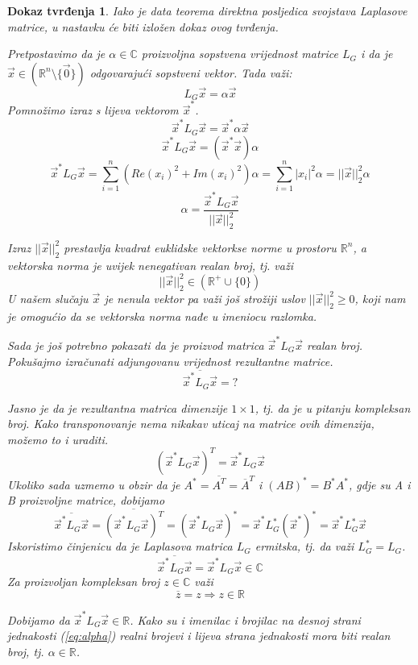 \documentclass[11pt]{article}
\newtheorem*{custom_proof}{Dokaz tvrđenja}
\begin{document}
	\begin{custom_proof}
	Iako je data teorema direktna posljedica svojstava Laplasove matrice, u nastavku će biti izložen dokaz ovog tvrđenja.
	
	Pretpostavimo da je $\alpha \in \mathbb{C}$ proizvoljna sopstvena vrijednost matrice $L_G$ i da je $\vec{x} \in (\mathbb{R}^n \setminus \{\vec{0}\})$ odgovarajući sopstveni vektor. Tada važi:
	\[
		L_G\vec{x} = \alpha \vec{x}
	\]
	Pomnožimo izraz s lijeva vektorom $\vec{x}^*$.
	\[
		\vec{x}^*L_G\vec{x} = \vec{x}^*\alpha \vec{x}
	\]
	\[
		\vec{x}^*L_G\vec{x} = (\vec{x}^* \vec{x}) \alpha
	\]
	\[
		\vec{x}^*L_G\vec{x} = \sum_{i=1}^{n}(Re(x_i)^2 + Im(x_i)^2 ) \alpha =  \sum_{i=1}^{n}|x_i|^2 \alpha= ||\vec{x}||_2^2 \alpha  
	\]
	\begin{equation}
		 \alpha =   \frac{\vec{x}^*L_G\vec{x}}{||\vec{x}||_2^2}
	\label{eq:alpha}
	\end{equation}

	Izraz $||\vec{x}||_2^2$ prestavlja kvadrat euklidske vektorkse norme u prostoru $\mathbb{R}^n$, a vektorska norma je uvijek nenegativan realan broj, tj. važi
	\[
		||\vec{x}||_2^2 \in (\mathbb{R}^+ \cup \{0\})  
	\]
	U našem slučaju $\vec{x}$ je nenula vektor pa važi još strožiji uslov $||\vec{x}||_2^2 \ge 0$, koji nam je omogućio da se vektorska norma nađe u imeniocu razlomka.
	
	Sada je još potrebno pokazati da je proizvod matrica $\vec{x}^*L_G\vec{x}$ realan broj. Pokušajmo izračunati adjungovanu vrijednost rezultantne matrice.
	\[
		\overline{\vec{x}^*L_G\vec{x}} = ?
	\] 

	Jasno je da je rezultantna matrica dimenzije $1 \times 1$, tj. da je u pitanju kompleksan broj.
	Kako transponovanje nema nikakav uticaj na matrice ovih dimenzija, možemo to i uraditi. 
	\[
	(\vec{x}^*L_G\vec{x})^T = \vec{x}^*L_G\vec{x}
	\]
	Ukoliko sada uzmemo u obzir da je $A^*=\overline{A^T} =\overline{A}^T$ i $(AB)^* = B^* A^*$, gdje su A i B proizvoljne matrice, dobijamo
	\[
		\overline{\vec{x}^*L_G\vec{x}} = \overline{(\vec{x}^*L_G\vec{x})^T} = (\vec{x}^*L_G\vec{x})^* = \vec{x}^*L_G^*(\vec{x}^*)^*= \vec{x}^*L_G^*\vec{x}
	\] 
	Iskoristimo činjenicu da je Laplasova matrica $L_G$ ermitska, tj. da važi $L_G^*=L_G$.
	\[
		\overline{\vec{x}^*L_G\vec{x}} = \vec{x}^*L_G\vec{x} \in \mathbb{C}
	\] 
	Za proizvoljan kompleksan broj $z \in \mathbb{C}$ važi
	\[
	 \overline{z} = z \Rightarrow z \in \mathbb{R}
	\]

	Dobijamo da $\vec{x}^*L_G\vec{x} \in \mathbb{R}$. Kako su i imenilac i brojilac na desnoj strani jednakosti (\ref{eq:alpha}) realni brojevi i lijeva strana jednakosti mora biti realan broj, tj. $\alpha \in \mathbb{R}$.


\end{custom_proof}
\end{document}

